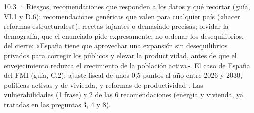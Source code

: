 \begin{complemento}{10.3 · Riesgos, recomendaciones que responden a los datos y qué recortar}
 (guía, VI.1 y D.6): recomendaciones genéricas que valen para cualquier país («hacer reformas estructurales»); recetas tajantes o demasiado precisas; olvidar la demografía, que el enunciado pide expresamente; no ordenar los desequilibrios.  del cierre: «España tiene que aprovechar una expansión sin desequilibrios privados para corregir los públicos y elevar la productividad, antes de que el envejecimiento reduzca el crecimiento de la población activa».  El caso de España del FMI (guía, C.2): ajuste fiscal de unos 0,5 puntos al año entre 2026 y 2030, políticas activas y de vivienda, y reformas de productividad \parencite{FMI2026ArticuloIV}.  Las vulnerabilidades (1 frase) y 2 de las 6 recomendaciones (energía y vivienda, ya tratadas en las preguntas 3, 4 y 8).
\end{complemento}
